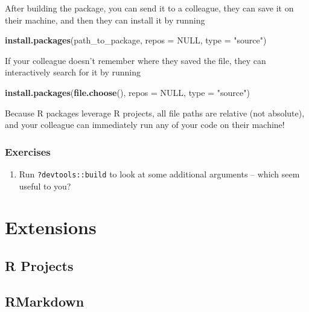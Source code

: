 \documentclass[
]{book}
\newenvironment{Shaded}{\begin{snugshade}}{\end{snugshade}}
\newcommand{\DataTypeTok}[1]{\textcolor[rgb]{0.13,0.29,0.53}{#1}}
\newcommand{\KeywordTok}[1]{\textcolor[rgb]{0.13,0.29,0.53}{\textbf{#1}}}
\newcommand{\NormalTok}[1]{#1}
\newcommand{\OtherTok}[1]{\textcolor[rgb]{0.56,0.35,0.01}{#1}}
\newcommand{\StringTok}[1]{\textcolor[rgb]{0.31,0.60,0.02}{#1}}
\providecommand{\tightlist}{%
  \setlength{\itemsep}{0pt}\setlength{\parskip}{0pt}}
\begin{document}
After building the package, you can send it to a colleague, they can save it on their machine, and then they can install it by running

\begin{Shaded}
\begin{Highlighting}[]
\KeywordTok{install.packages}\NormalTok{(path_to_package, }\DataTypeTok{repos =} \OtherTok{NULL}\NormalTok{, }\DataTypeTok{type =} \StringTok{"source"}\NormalTok{)}
\end{Highlighting}
\end{Shaded}

If your colleague doesn't remember where they saved the file, they can interactively search for it by running

\begin{Shaded}
\begin{Highlighting}[]
\KeywordTok{install.packages}\NormalTok{(}\KeywordTok{file.choose}\NormalTok{(), }\DataTypeTok{repos =} \OtherTok{NULL}\NormalTok{, }\DataTypeTok{type =} \StringTok{"source"}\NormalTok{)}
\end{Highlighting}
\end{Shaded}

Because R packages leverage R projects, all file paths are relative (not absolute), and your colleague can immediately run any of your code on their machine!

\hypertarget{exercises-8}{%
\subsection{Exercises}\label{exercises-8}}

\begin{enumerate}
\def\labelenumi{\arabic{enumi}.}
\tightlist
\item
  Run \texttt{?devtools::build} to look at some additional arguments -- which seem useful to you?
\end{enumerate}

\hypertarget{extensions}{%
\chapter{Extensions}\label{extensions}}

\hypertarget{r-projects}{%
\section{R Projects}\label{r-projects}}

\hypertarget{rmarkdown}{%
\section{RMarkdown}\label{rmarkdown}}
\end{document}
